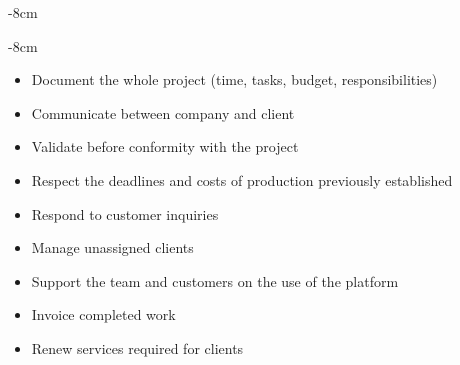 \documentclass[9pt,a4paper]{altacv}
\begin{document}

\begin{adjustwidth}{}{-8cm}
\makecvheader
\end{adjustwidth}
\begin{adjustwidth}{}{-8cm}

\end{adjustwidth}

\begin{itemize}
\item Document the whole project (time, tasks, budget, responsibilities)
\item Communicate between company and client
\item Validate before conformity with the project
\item Respect the deadlines and costs of production previously established
\item Respond to customer inquiries
\item Manage unassigned clients
\item Support the team and customers on the use of the platform
\item Invoice completed work
\item Renew services required for clients
\end{itemize}
\end{document}

